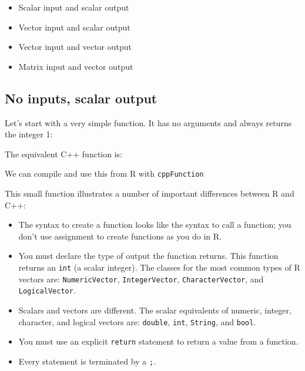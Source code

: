 \begin{itemize}
\itemsep1pt\parskip0pt
\item
  Scalar input and scalar output
\item
  Vector input and scalar output
\item
  Vector input and vector output
\item
  Matrix input and vector output
\end{itemize}

\subsection{No inputs, scalar output}

Let's start with a very simple function. It has no arguments and always
returns the integer 1:

\begin{Shaded}
\begin{Highlighting}[]
\StringTok{ }
\end{Highlighting}
\end{Shaded}

The equivalent C++ function is:

\begin{Shaded}
\begin{Highlighting}[]
 
   \NormalTok{;}
\NormalTok{\}}
\end{Highlighting}
\end{Shaded}

We can compile and use this from R with \texttt{cppFunction}

\begin{Shaded}
\begin{Highlighting}[]
\NormalTok{(}
\NormalTok{)}
\end{Highlighting}
\end{Shaded}

This small function illustrates a number of important differences
between R and C++:

\begin{itemize}
\item
  The syntax to create a function looks like the syntax to call a
  function; you don't use assignment to create functions as you do in R.
\item
  You must declare the type of output the function returns. This
  function returns an \texttt{int} (a scalar integer). The classes for
  the most common types of R vectors are: \texttt{NumericVector},
  \texttt{IntegerVector}, \texttt{CharacterVector}, and
  \texttt{LogicalVector}.
\item
  Scalars and vectors are different. The scalar equivalents of numeric,
  integer, character, and logical vectors are: \texttt{double},
  \texttt{int}, \texttt{String}, and \texttt{bool}.
\item
  You must use an explicit \texttt{return} statement to return a value
  from a function.
\item
  Every statement is terminated by a \texttt{;}.
\end{itemize}

